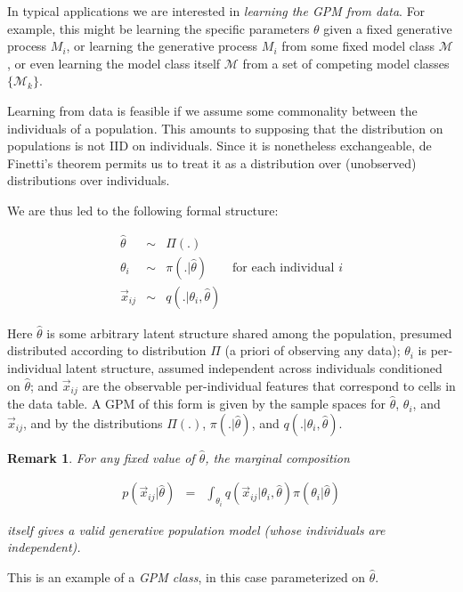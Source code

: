 \documentclass[10pt,letterpaper]{article}
\newtheorem{remark}{Remark}[section]
\newcommand{\set}[1]{\{#1\}}
\begin{document}

In typical applications we are interested in \textit{learning
the GPM from data}. For example, this might be learning the specific
parameters $\theta$ given a fixed generative process $M_i$, or learning the
generative process $M_i$ from some fixed model class $\mathcal{M}$, or even
learning the model class itself $\mathcal{M}$ from a set of competing model
classes $\set{\mathcal{M}_k}$.

Learning from data is feasible if we assume some commonality between
the individuals of a population.  This amounts to supposing that the
distribution on populations is not IID on individuals.  Since it
is nonetheless exchangeable, de Finetti's theorem 
permits us to treat it as a distribution over (unobserved) distributions
over individuals.

We are thus led to the following formal structure:

\begin{eqnarray*}
\hat{\theta} & \sim & \Pi(.) \\
\theta_i & \sim & \pi(.|\hat\theta) \qquad \textrm{for each individual $i$} \\
\vec{x}_{ij} & \sim & q(.|\theta_i, \hat\theta)
\end{eqnarray*}

Here $\hat\theta$ is some arbitrary latent structure shared among the
population, presumed distributed according to distribution $\Pi$ (a
priori of observing any data); $\theta_i$ is per-individual latent
structure, assumed independent across individuals conditioned on
$\hat\theta$; and $\vec{x}_{ij}$ are the observable per-individual
features that correspond to cells in the data table.  A GPM of this form is given by the
sample spaces for $\hat\theta$, $\theta_i$, and $\vec{x}_{ij}$, and by the
distributions $\Pi(.)$, $\pi(.|\hat\theta)$, and $q(.|\theta_i, \hat\theta)$.

\begin{remark}
For any fixed value of $\hat\theta$, the marginal composition

\begin{eqnarray}
 p(\vec{x}_{ij}|\hat\theta) & = &
 \int_{\theta_i} q(\vec{x}_{ij}|\theta_i, \hat\theta) \pi(\theta_i|\hat\theta)
 \label{eqn:marginal-individual}
\end{eqnarray}

itself gives a valid generative population model (whose individuals
are independent). \label{rem:gpm-class}
\end{remark}
This is an example of a \emph{GPM class}, in this
case parameterized on $\hat\theta$.
\end{document}
